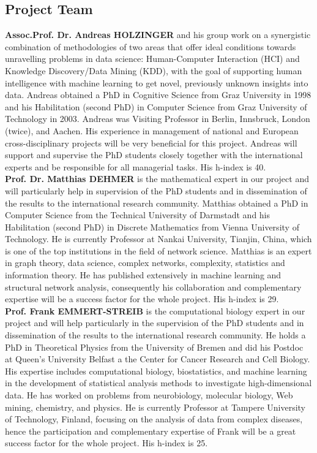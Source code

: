 \documentclass[a4paper,11pt]{article}
\begin{document}
\subsection{Project Team}

\textbf{Assoc.Prof. Dr. Andreas HOLZINGER} and his group work on a synergistic combination of methodologies of two areas that offer ideal conditions towards unravelling problems in data science: Human-Computer Interaction (HCI) and Knowledge Discovery/Data Mining (KDD), with the goal of supporting human intelligence with machine learning to get novel, previously unknown insights into data. Andreas obtained a PhD in Cognitive Science from Graz University in 1998 and his Habilitation (second PhD) in Computer Science from Graz University of Technology in 2003. Andreas was Visiting Professor in Berlin, Innsbruck, London (twice), and Aachen. His experience in management of national and European cross-disciplinary projects will be very beneficial for this project. Andreas will support and supervise the PhD students closely together with the international experts and be responsible for all managerial tasks. His h-index is 40.
\\[0,2cm]
\textbf{Prof. Dr. Matthias DEHMER} is the mathematical expert in our project and will particularly help in supervision of the PhD students and in dissemination of the results to the international research community. Matthias obtained a PhD in Computer Science from the Technical University of Darmstadt and his Habilitation (second PhD) in Discrete Mathematics from Vienna University of Technology. He is currently Professor at Nankai University, Tianjin, China, which is one of the top institutions in the field of network science. Matthias is an expert in graph theory, data science, complex networks, complexity, statistics and information theory. He has published extensively in machine learning and structural network analysis, consequently his collaboration and complementary expertise will be a success factor for the whole project. His h-index is 29.  
\\[0,2cm]
\textbf{Prof. Frank EMMERT-STREIB} is the computational biology expert in our project and will help particularly in the supervision of the PhD students and in dissemination of the results to the international research community. He holds a PhD in Theoretical Physics from the University of Bremen and did his Postdoc at Queen's University Belfast a the Center for Cancer Research and Cell Biology. His expertise includes computational biology, biostatistics, and machine learning in the development of statistical analysis methods to investigate high-dimensional data. He has worked on problems from neurobiology, molecular biology, Web mining, chemistry, and physics. He is currently Professor at Tampere University of Technology, Finland, focusing on the analysis of data from complex diseases, hence the participation and complementary expertise of Frank will be a great success factor for the whole project. His h-index is 25.
\end{document}
